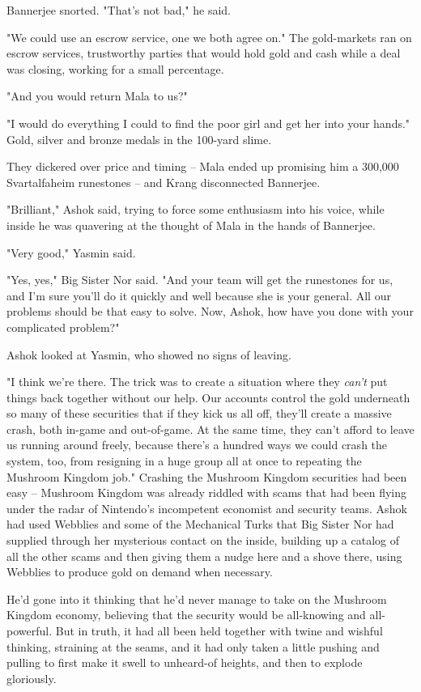 Bannerjee snorted. "That's not bad," he said.

"We could use an escrow service, one we both agree on." The
gold-markets ran on escrow services, trustworthy parties that would
hold gold and cash while a deal was closing, working for a small
percentage.

"And you would return Mala to us?"

"I would do everything I could to find the poor girl and get her
into your hands." Gold, silver and bronze medals in the 100-yard
slime.

They dickered over price and timing -- Mala ended up promising him
a 300,000 Svartalfaheim runestones -- and Krang disconnected
Bannerjee.

"Brilliant," Ashok said, trying to force some enthusiasm into his
voice, while inside he was quavering at the thought of Mala in the
hands of Bannerjee.

"Very good," Yasmin said.

"Yes, yes," Big Sister Nor said. "And your team will get the
runestones for us, and I'm sure you'll do it quickly and well
because she is your general. All our problems should be that easy
to solve. Now, Ashok, how have you done with your complicated
problem?"

Ashok looked at Yasmin, who showed no signs of leaving.

"I think we're there. The trick was to create a situation where
they \emph{can't} put things back together without our help. Our
accounts control the gold underneath so many of these securities
that if they kick us all off, they'll create a massive crash, both
in-game and out-of-game. At the same time, they can't afford to
leave us running around freely, because there's a hundred ways we
could crash the system, too, from resigning in a huge group all at
once to repeating the Mushroom Kingdom job." Crashing the Mushroom
Kingdom securities had been easy -- Mushroom Kingdom was already
riddled with scams that had been flying under the radar of
Nintendo's incompetent economist and security teams. Ashok had used
Webblies and some of the Mechanical Turks that Big Sister Nor had
supplied through her mysterious contact on the inside, building up
a catalog of all the other scams and then giving them a nudge here
and a shove there, using Webblies to produce gold on demand when
necessary.

He'd gone into it thinking that he'd never manage to take on the
Mushroom Kingdom economy, believing that the security would be
all-knowing and all-powerful. But in truth, it had all been held
together with twine and wishful thinking, straining at the seams,
and it had only taken a little pushing and pulling to first make it
swell to unheard-of heights, and then to explode gloriously.


